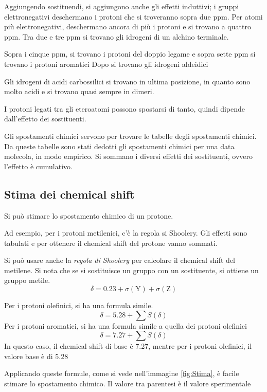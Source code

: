 
Aggiungendo sostituendi, si aggiungono anche gli effetti induttivi; i gruppi elettronegativi deschermano i protoni che si troveranno sopra due ppm.
Per atomi più elettronegativi, deschermano ancora di più i protoni e si trovano a quattro ppm.
Tra due e tre ppm si trovano gli idrogeni di un alchino terminale.

Sopra i cinque ppm, si trovano i protoni del doppio legame e sopra sette ppm si trovano i protoni aromatici
Dopo si trovano gli idrogeni aldeidici

Gli idrogeni di acidi carbossilici si trovano in ultima posizione, in quanto sono molto acidi e si trovano quasi sempre in dimeri.

I protoni legati tra gli eteroatomi possono spostarsi di tanto, quindi
dipende dall'effetto dei sostituenti.

Gli spostamenti chimici servono per trovare le tabelle degli spostamenti
chimici. Da queste tabelle sono stati dedotti gli spostamenti chimici
per una data molecola, in modo empirico. Si sommano i diversi effetti
dei sostituenti, ovvero l'effetto è cumulativo.

\subsection{Stima dei chemical shift}
Si può  stimare lo spostamento chimico di un protone.

Ad esempio, per i protoni metilenici, c'è la regola si Shoolery. Gli effetti sono tabulati e per ottenere il chemical shift del protone vanno sommati.

Si può usare anche la \emph{regola di Shoolery} per calcolare il chemical shift del metilene. Si nota che se si sostituisce un gruppo con un sostituente, si ottiene un gruppo metile.
\[
  \delta = 0.23 + \sigma(\text{Y}) + \sigma(\text{Z})
\]

Per i protoni olefinici, si ha una formula simile.
\[
  \delta = 5.28 + \sum S(\delta)
\]
Per i protoni aromatici, si ha una formula simile a quella dei protoni olefinici
\[
  \delta = 7.27 + \sum S(\delta)
\]
In questo caso, il chemical shift di base è 7.27, mentre per i protoni olefinici, il valore base è di 5.28


Applicando queste formule, come si vede nell'immagine \ref{fig:Stima}, è facile stimare lo spostamento chimico. Il valore tra parentesi è il valore sperimentale

